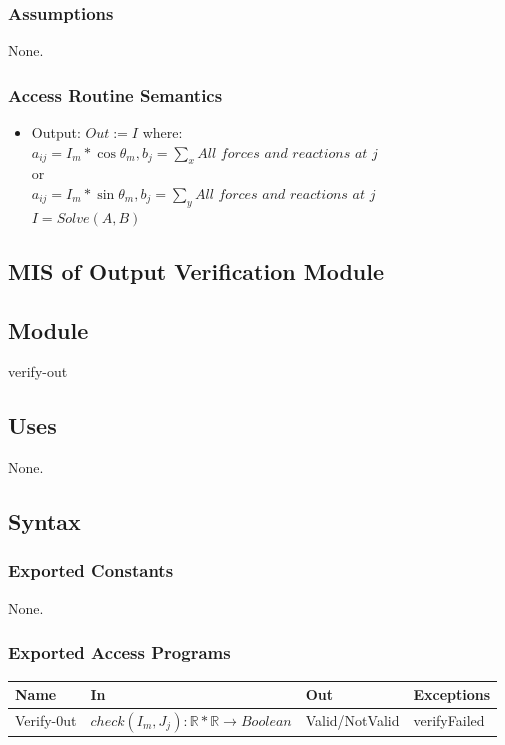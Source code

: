 \documentclass[12pt, titlepage]{article}
\begin{document}
\subsubsection{Assumptions}
None.
\subsubsection{Access Routine Semantics}
\begin{itemize}
    \item Output: $Out:=I$ where:\\
    
    $a_{ij}=I_m*\cos\theta_{m},b_j=\sum_x \textit{All forces and reactions at j}$\\
or\\
$a_{ij}=I_m*\sin\theta_{m},b_j=\sum_y \textit{All forces and reactions at j}$\\

$I=Solve(A,B)$\\
\end{itemize}
\subsection{MIS of Output Verification Module \label{mSpec} }

\subsection{Module}

verify-out

\subsection{Uses}
None.

\subsection{Syntax}

\subsubsection{Exported Constants}
None.
\subsubsection{Exported Access Programs}
\begin{center}
\begin{tabular}{p{2cm} p{4cm} p{4cm} p{2cm}}
\hline
\textbf{Name} & \textbf{In} & \textbf{Out} & \textbf{Exceptions} \\
\hline

Verify-0ut & $check(I_m,J_j):\mathbb{R}*\mathbb{R} \rightarrow {Boolean}$  & Valid/NotValid & verifyFailed \\
\hline
\end{tabular}
\end{center}
\end{document}
